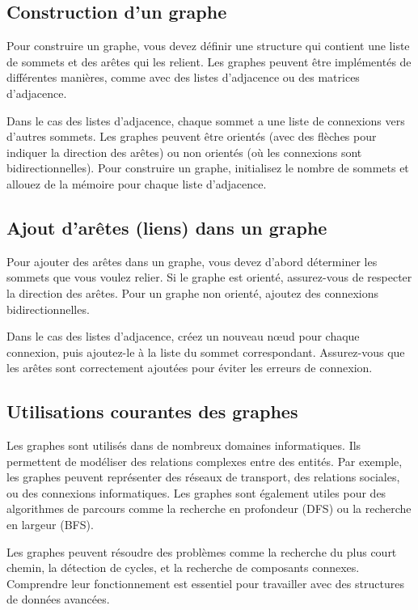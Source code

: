 \subsection{Construction d'un graphe}
Pour construire un graphe, vous devez définir une structure qui contient une liste de sommets et des arêtes qui les relient. Les graphes peuvent être implémentés de différentes manières, comme avec des listes d'adjacence ou des matrices d'adjacence.

Dans le cas des listes d'adjacence, chaque sommet a une liste de connexions vers d'autres sommets. Les graphes peuvent être orientés (avec des flèches pour indiquer la direction des arêtes) ou non orientés (où les connexions sont bidirectionnelles). Pour construire un graphe, initialisez le nombre de sommets et allouez de la mémoire pour chaque liste d'adjacence.

\subsection{Ajout d'arêtes (liens) dans un graphe}
Pour ajouter des arêtes dans un graphe, vous devez d'abord déterminer les sommets que vous voulez relier. Si le graphe est orienté, assurez-vous de respecter la direction des arêtes. Pour un graphe non orienté, ajoutez des connexions bidirectionnelles. 

Dans le cas des listes d'adjacence, créez un nouveau nœud pour chaque connexion, puis ajoutez-le à la liste du sommet correspondant. Assurez-vous que les arêtes sont correctement ajoutées pour éviter les erreurs de connexion.

\subsection{Utilisations courantes des graphes}
Les graphes sont utilisés dans de nombreux domaines informatiques. Ils permettent de modéliser des relations complexes entre des entités. Par exemple, les graphes peuvent représenter des réseaux de transport, des relations sociales, ou des connexions informatiques. Les graphes sont également utiles pour des algorithmes de parcours comme la recherche en profondeur (DFS) ou la recherche en largeur (BFS).

Les graphes peuvent résoudre des problèmes comme la recherche du plus court chemin, la détection de cycles, et la recherche de composants connexes. Comprendre leur fonctionnement est essentiel pour travailler avec des structures de données avancées.

